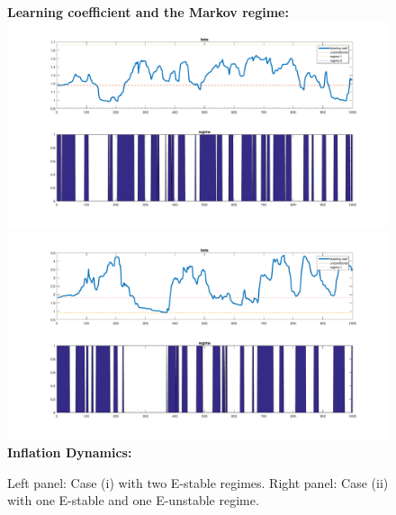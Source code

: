 \documentclass[12pt,reqno]{article}
\numberwithin{equation}{section}
\begin{document}
\begin{figure}[H]

\caption{Left panel: Case (i) with two E-stable regimes. Right panel: Case (ii) with one E-stable and one E-unstable regime. }
\label{fisher_simul}

\textbf{Learning coefficient and the Markov regime:} \\
\includegraphics[scale=0.2]{fisher_simulation1_learningCoef.pdf}
\includegraphics[scale=0.2]{fisher_simulation2_learningCoef.pdf}\\

\textbf{Inflation Dynamics: } \\


\end{figure}
\end{document}
